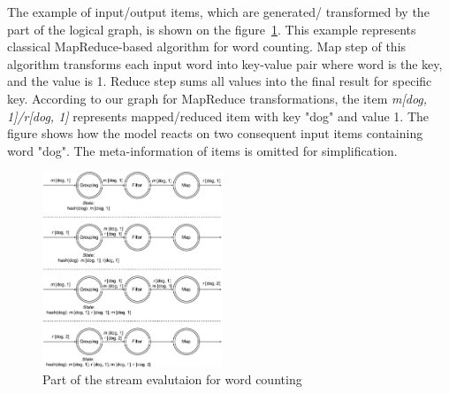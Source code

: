 The example of input/output items, which are generated/ transformed by the part of the logical graph, is shown on the figure~\ref {word-count-figure}. This example represents classical MapReduce-based algorithm for word counting. Map step of this algorithm transforms each input word into key-value pair where word is the key, and the value is 1. Reduce step sums all values into the final result for specific key. According to our graph for MapReduce transformations, the item {\it m[dog, 1]/r[dog, 1]} represents mapped/reduced item with key "dog" and value 1. The figure shows how the model reacts on two consequent input items containing word "dog". The meta-information of items is omitted for simplification.

\begin{figure}[htbp]
  \centering
  \includegraphics[width=0.48\textwidth]{pics/wordcount}
  \caption{Part of the stream evalutaion for word counting}
  \label {word-count-figure}
\end{figure}

